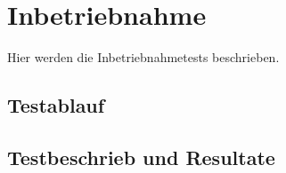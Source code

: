 \section{Inbetriebnahme}
Hier werden die Inbetriebnahmetests beschrieben.

\subsection{Testablauf}

\subsection{Testbeschrieb und Resultate}

